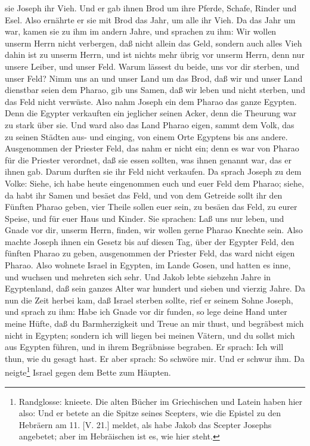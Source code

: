 sie Joseph ihr Vieh. Und er gab ihnen Brod um ihre Pferde, Schafe, Rinder und Esel. Also ernährte er sie mit Brod das Jahr, um alle ihr Vieh. Da das Jahr um war, kamen sie zu ihm im andern Jahre, und sprachen zu ihm: Wir wollen unserm Herrn nicht verbergen, daß nicht allein das Geld, sondern auch alles Vieh dahin ist zu unserm Herrn, und ist nichts mehr übrig vor unserm Herrn, denn nur unsere Leiber, und unser Feld. Warum lässest du beide, uns vor dir sterben, und unser Feld? Nimm uns an und unser Land um das Brod, daß wir und unser Land dienstbar seien dem Pharao, gib uns Samen, daß wir leben und nicht sterben, und das Feld nicht verwüste. Also nahm Joseph ein dem Pharao das ganze Egypten. Denn die Egypter verkauften ein jeglicher seinen Acker, denn die Theurung war zu stark über sie. Und ward also das Land Pharao eigen, sammt dem Volk, das zu seinen Städten aus- und einging, von einem Orte Egyptens bis ans andere. Ausgenommen der Priester Feld, das nahm er nicht ein; denn es war von Pharao für die Priester verordnet, daß sie essen sollten, was ihnen genannt war, das er ihnen gab. Darum durften sie ihr Feld nicht verkaufen. Da sprach Joseph zu dem Volke: Siehe, ich habe heute eingenommen euch und euer Feld dem Pharao; siehe, da habt ihr Samen und besäet das Feld, und von dem Getreide sollt ihr den Fünften Pharao geben, vier Theile sollen euer sein, zu besäen das Feld, zu eurer Speise, und für euer Haus und Kinder. Sie sprachen: Laß uns nur leben, und Gnade vor dir, unserm Herrn, finden, wir wollen gerne Pharao Knechte sein. Also machte Joseph ihnen ein Gesetz bis auf diesen Tag, über der Egypter Feld, den fünften Pharao zu geben, ausgenommen der Priester Feld, das ward nicht eigen Pharao. Also wohnete Israel in Egypten, im Lande Gosen, und hatten es inne, und wuchsen und mehreten sich sehr. Und Jakob lebte siebzehn Jahre in Egyptenland, daß sein ganzes Alter war hundert und sieben und vierzig Jahre. Da nun die Zeit herbei kam, daß Israel sterben sollte, rief er seinem Sohne Joseph, und sprach zu ihm: Habe ich Gnade vor dir funden, so lege deine Hand unter meine Hüfte, daß du Barmherzigkeit und Treue an mir thust, und begräbest mich nicht in Egypten; sondern ich will liegen bei meinen Vätern, und du sollst mich aus Egypten führen, und in ihrem Begräbnisse begraben. Er sprach: Ich will thun, wie du gesagt hast. Er aber sprach: So schwöre mir. Und er schwur ihm. Da neigte\footnote{Randglosse: knieete. Die alten Bücher im Griechischen und Latein haben hier also: Und er betete an die Spitze seines Scepters, wie die Epistel zu den Hebräern am 11. [V. 21.] meldet, als habe Jakob das Scepter Josephs angebetet; aber im Hebräischen ist es, wie hier steht.} Israel gegen dem Bette zum Häupten.

